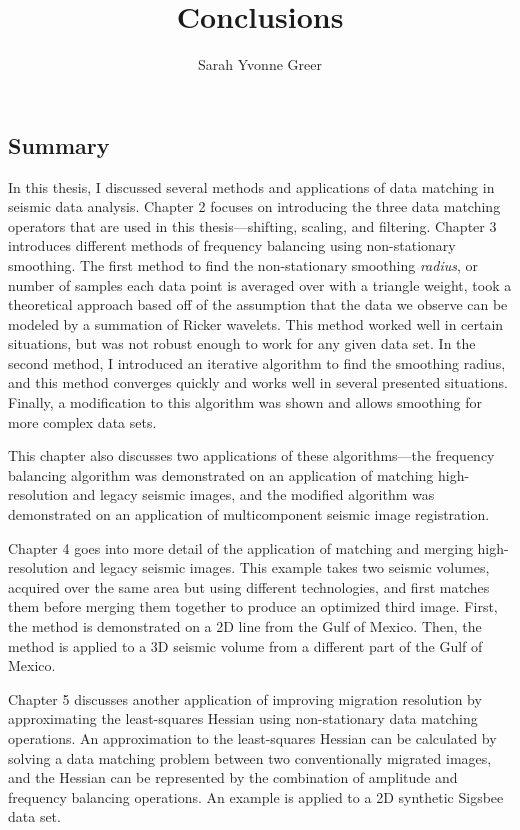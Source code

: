 \title{Conclusions}
\author{Sarah Yvonne Greer}
\label{ch:chapter-conclusion}

\maketitle

\subsection{Summary}

In this thesis, I discussed several methods and applications of data matching in seismic data analysis.
Chapter 2 focuses on introducing the three data matching operators that are used in this thesis---shifting, scaling, and filtering.
Chapter 3 introduces different methods of frequency balancing using non-stationary smoothing. 
The first method to find the non-stationary smoothing {\em radius}, or number of samples each data point is averaged over with a triangle weight, took a theoretical approach based off of the assumption that the data we observe can be modeled by a summation of Ricker wavelets.
This method worked well in certain situations, but was not robust enough to work for any given data set.
In the second method, I introduced an iterative algorithm to find the smoothing radius, and this method converges quickly and works well in several presented situations. 
Finally, a modification to this algorithm was shown and allows smoothing for more complex data sets.

This chapter also discusses two applications of these algorithms---the frequency balancing algorithm was demonstrated on an application of matching high-resolution and legacy seismic images, and the modified algorithm was demonstrated on an application of multicomponent seismic image registration.

Chapter 4 goes into more detail of the application of matching and merging high-resolution and legacy seismic images.
This example takes two seismic volumes, acquired over the same area but using different technologies, and first matches them before merging them together to produce an optimized third image.
First, the method is demonstrated on a 2D line from the Gulf of Mexico.
Then, the method is applied to a 3D seismic volume from a different part of the Gulf of Mexico.

Chapter 5 discusses another application of improving migration resolution by approximating the least-squares Hessian using non-stationary data matching operations.
An approximation to the least-squares Hessian can be calculated by solving a data matching problem between two conventionally migrated images, and the Hessian can be represented by the combination of amplitude and frequency balancing operations.
An example is applied to a 2D synthetic Sigsbee data set.

